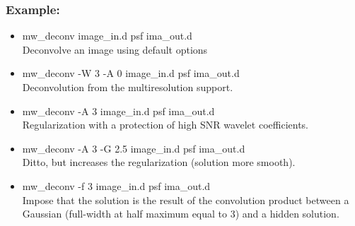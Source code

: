 \subsubsection*{Example:}
\begin{itemize}
\baselineskip=0.4truecm
\itemsep=0.1truecm
\item mw\_deconv image\_in.d psf ima\_out.d \\
 Deconvolve an image using default options
\item mw\_deconv -W 3 -A 0  image\_in.d psf ima\_out.d \\
Deconvolution from the multiresolution support.
\item mw\_deconv -A 3 image\_in.d psf ima\_out.d \\
Regularization with a protection of high SNR wavelet coefficients.
\item mw\_deconv -A 3 -G 2.5 image\_in.d psf ima\_out.d \\
Ditto, but increases the regularization (solution more smooth).
\item mw\_deconv -f 3 image\_in.d psf ima\_out.d \\
Impose that the solution is the result of the convolution product between
a Gaussian (full-width at half maximum equal to 3) and a hidden solution.
\end{itemize}
